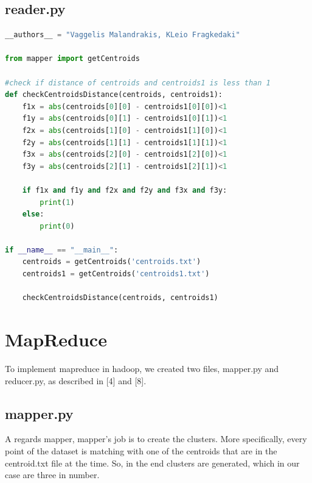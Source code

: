 \subsection{reader.py}
\begin{lstlisting}[language=Python]
__authors__ = "Vaggelis Malandrakis, KLeio Fragkedaki"

from mapper import getCentroids
	
#check if distance of centroids and centroids1 is less than 1
def checkCentroidsDistance(centroids, centroids1):
	f1x = abs(centroids[0][0] - centroids1[0][0])<1
	f1y = abs(centroids[0][1] - centroids1[0][1])<1
	f2x = abs(centroids[1][0] - centroids1[1][0])<1
	f2y = abs(centroids[1][1] - centroids1[1][1])<1
	f3x = abs(centroids[2][0] - centroids1[2][0])<1
	f3y = abs(centroids[2][1] - centroids1[2][1])<1

	if f1x and f1y and f2x and f2y and f3x and f3y:
		print(1)
	else:
		print(0)

if __name__ == "__main__":
	centroids = getCentroids('centroids.txt')
	centroids1 = getCentroids('centroids1.txt')
	
	checkCentroidsDistance(centroids, centroids1)

\end{lstlisting}

\section{MapReduce}
To implement mapreduce in hadoop, we created two files, mapper.py and reducer.py, as described in [4] and [8].

\subsection{mapper.py}
 A regards mapper, mapper's job is to create the clusters. More specifically, every point of the dataset is matching with one of the centroids that are in the centroid.txt file at the time. So, in the end clusters are generated, which in our case are three in number.
 
 \HRule \\[0.2cm] %
 
